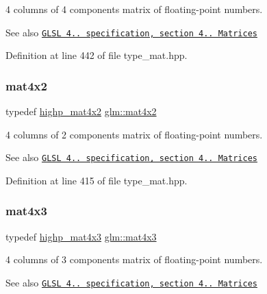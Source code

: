 4 columns of 4 components matrix of floating-\/point numbers.

\begin{DoxySeeAlso}{See also}
\href{http://www.opengl.org/registry/doc/GLSLangSpec.4.20.8.pdf}{\tt G\+L\+SL 4.. specification, section 4.. Matrices} 
\end{DoxySeeAlso}


Definition at line 442 of file type\+\_\+mat.\+hpp.

\mbox{\label{group__core__types_ga72cf8ec4f4cda85943f4683531e421bc}} 
\subsubsection{\texorpdfstring{mat4x2}{mat4x2}}
{\footnotesize\ttfamily typedef \hyperlink{group__core__precision_gadf9c4a7947c2b0a79f52cc86a860f270}{highp\+\_\+mat4x2} \hyperlink{group__core__types_ga72cf8ec4f4cda85943f4683531e421bc}{glm\+::mat4x2}}

4 columns of 2 components matrix of floating-\/point numbers.

\begin{DoxySeeAlso}{See also}
\href{http://www.opengl.org/registry/doc/GLSLangSpec.4.20.8.pdf}{\tt G\+L\+SL 4.. specification, section 4.. Matrices} 
\end{DoxySeeAlso}


Definition at line 415 of file type\+\_\+mat.\+hpp.

\mbox{\label{group__core__types_gad3f3f750dcdc74a9037342c5cae55f5e}} 
\subsubsection{\texorpdfstring{mat4x3}{mat4x3}}
{\footnotesize\ttfamily typedef \hyperlink{group__core__precision_gab8dfe989c5100c35ab5dec0e94f59d2a}{highp\+\_\+mat4x3} \hyperlink{group__core__types_gad3f3f750dcdc74a9037342c5cae55f5e}{glm\+::mat4x3}}

4 columns of 3 components matrix of floating-\/point numbers.

\begin{DoxySeeAlso}{See also}
\href{http://www.opengl.org/registry/doc/GLSLangSpec.4.20.8.pdf}{\tt G\+L\+SL 4.. specification, section 4.. Matrices} 
\end{DoxySeeAlso}


